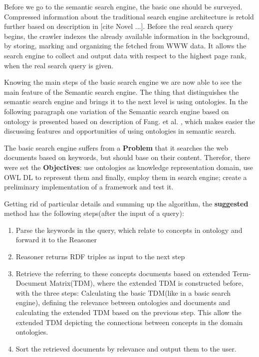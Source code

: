 		Before we go to the semantic search engine, the basic one should be surveyed. Compressed information about the traditional search engine architecture is retold further based on description in [cite Novel ...]. Before the real search query begins, the crawler indexes the already available information in the background, by  storing, marking and organizing the fetched from WWW data. It allows the search engine to collect and output data with respect to the highest page rank, when the real search query is given.
		
		Knowing the main steps of the basic search engine we are now able to see the main feature of the Semantic search engine. The thing that distinguishes the semantic search engine and brings it to the next level is using ontologies. In the following paragraph one variation of the Semantic search engine based on ontology is presented based on description of Fang. et al. \cite{Fang05}, which makes easier the discussing features and opportunities of using ontologies in semantic search.
		        
		The basic search engine suffers from a \textbf{Problem} that it searches the web documents based on keywords, but should base on their content. Therefor, there were set the \textbf{Objectives}: use ontologies as knowledge representation domain, use OWL DL to represent them and finally, employ them in search engine; create a preliminary implementation of a framework and test it. 
		
		Getting rid of particular details and summing up the algorithm, the \textbf{suggested} method has the following steps(after the input of a query):
			\begin{enumerate}
				\item Parse the keywords in the query, which relate to concepts in ontology and forward it to the Reasoner
				\item Reasoner returns RDF triples as input to the next step
				\item Retrieve the referring to these concepts documents based on extended Term-Document Matrix(TDM), where the extended TDM is constructed before, with the three steps: Calculating the basic TDM(like in a basic search engine), defining the relevance between ontologies and documents and calculating the extended TDM based on the previous step. This allow the extended TDM depicting the connections between concepts in the domain ontologies.
				\item Sort the retrieved documents by relevance and output them to the user.   
			\end{enumerate}
		
